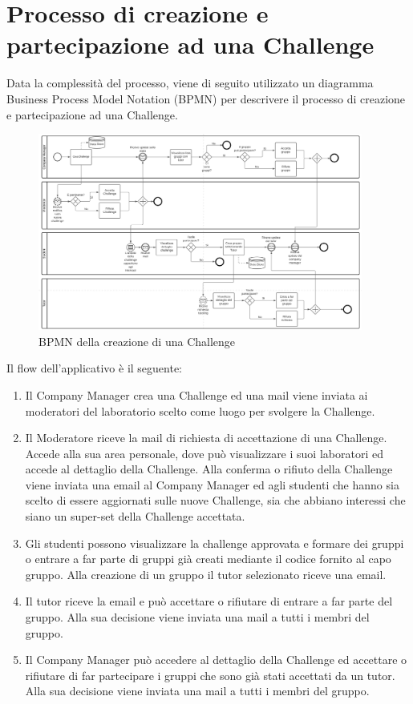 \section{Processo di creazione e partecipazione ad una Challenge}

Data la complessità del processo, viene di seguito utilizzato un diagramma Business Process Model Notation (BPMN) per descrivere il processo di creazione e partecipazione ad una Challenge. 

\begin{figure}[H]
    \centering
        \includegraphics[width=0.95\textwidth]{images/BPMN_Challenge.png}
    \caption{BPMN della creazione di una Challenge}
    \label{fig:BPMN_Challenge}
\end{figure}


Il flow dell'applicativo è il seguente:
\begin{enumerate}
    \item Il Company Manager crea una Challenge ed una mail viene inviata ai moderatori del laboratorio scelto come luogo per svolgere la Challenge.
    \item Il Moderatore riceve la mail di richiesta di accettazione di una Challenge. Accede alla sua area personale, dove può visualizzare i suoi laboratori ed accede al dettaglio della Challenge. Alla conferma o rifiuto della Challenge viene inviata una email al Company Manager ed agli studenti che hanno sia scelto di essere aggiornati sulle nuove Challenge, sia che abbiano interessi che siano un super-set della Challenge accettata.
    \item Gli studenti possono visualizzare la challenge approvata e formare dei gruppi o entrare a far parte di gruppi già creati mediante il codice fornito al capo gruppo. Alla creazione di un gruppo il tutor selezionato riceve una email.
    \item Il tutor riceve la email e può accettare o rifiutare di entrare a far parte del gruppo. Alla sua decisione viene inviata una mail a tutti i membri del gruppo.
    \item Il Company Manager può accedere al dettaglio della Challenge ed accettare o rifiutare di far partecipare i gruppi che sono già stati accettati da un tutor. Alla sua decisione viene inviata una mail a tutti i membri del gruppo.
\end{enumerate}


